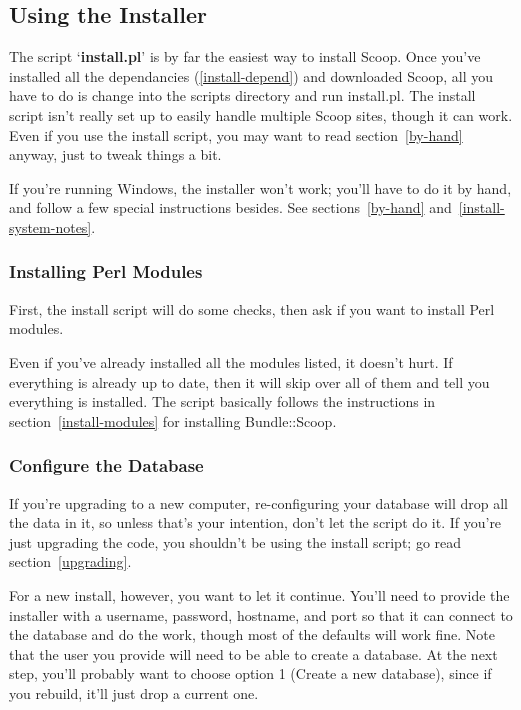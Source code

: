 \subsection{Using the Installer}

The script `{\bf install.pl}' is by far the easiest way to install Scoop.  Once you've installed all the dependancies (\ref{install-depend}) and downloaded Scoop, all you have to do is change into the scripts directory and run install.pl.  The install script isn't really set up to easily handle multiple Scoop sites, though it can work.  Even if you use the install script, you may want to read section~\ref{by-hand} anyway, just to tweak things a bit.

If you're running Windows, the installer won't work; you'll have to do it by hand, and follow a few special instructions besides.  See sections~\ref{by-hand} and~\ref{install-system-notes}.

\subsubsection{Installing Perl Modules}

First, the install script will do some checks, then ask if you want to install Perl modules. 

Even if you've already installed all the modules listed, it doesn't hurt. If everything is already up to date, then it will skip over all of them and tell you everything is installed.  The script basically follows the instructions in section~\ref{install-modules} for installing Bundle::Scoop.

\subsubsection{Configure the Database}

If you're upgrading to a new computer, re-configuring your database will drop all the data in it, so unless that's your intention, don't let the script do it.  If you're just upgrading the code, you shouldn't be using the install script; go read section~\ref{upgrading}.

For a new install, however, you want to let it continue.  You'll need to provide the installer with a username, password, hostname, and port so that it can connect to the database and do the work, though most of the defaults will work fine. Note that the user you provide will need to be able to create a database. At the next step, you'll probably want to choose option 1 (Create a new database), since if you rebuild, it'll just drop a current one.

